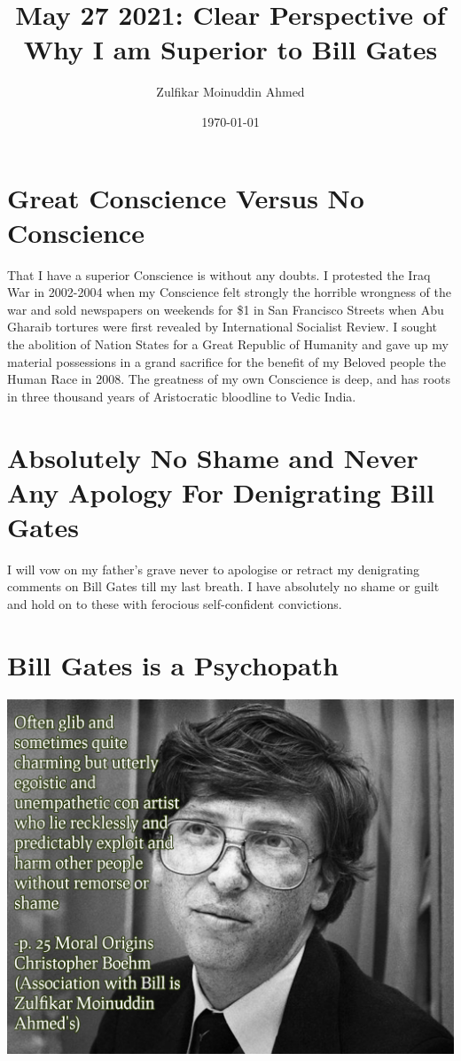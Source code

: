 \documentclass{amsart}
\title{May 27 2021:  Clear Perspective of Why I am Superior to Bill Gates}
\author{Zulfikar Moinuddin Ahmed}
\date{\today}
\begin{document}
\maketitle

\section{Great Conscience Versus No Conscience}

That I have a superior Conscience is without any doubts.  I protested the Iraq War in 2002-2004 when my Conscience felt strongly the horrible wrongness of the war and sold newspapers on weekends for \$1 in San Francisco Streets when Abu Gharaib tortures were first revealed by International Socialist Review.  I sought the abolition of Nation States for a Great Republic of Humanity and gave up my material possessions in a grand sacrifice for the benefit of my Beloved people the Human Race in 2008.  The greatness of my own Conscience is deep, and has roots in three thousand years of Aristocratic bloodline to Vedic India.

\section{Absolutely No Shame and Never Any Apology For Denigrating Bill Gates}

I will vow on my father's grave never to apologise or retract my denigrating comments on Bill Gates till my last breath.  I have absolutely no shame or guilt and hold on to these with ferocious self-confident convictions.
\pagebreak

\section{Bill Gates is a Psychopath}

\includegraphics[scale=0.6]{glib.jpg}
\end{document}
